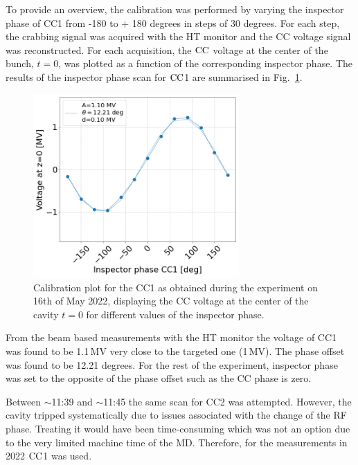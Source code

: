 To provide an overview, the calibration was performed by varying the inspector phase of CC1 from -180 to + 180 degrees in steps of 30 degrees. For each step, the crabbing signal was acquired with the HT monitor and the CC voltage signal was reconstructed. For each acquisition, the ${\mathrm{CC}}$ voltage at the center of the bunch, $t=0$, was plotted as a function of the corresponding inspector phase. The results of the inspector phase scan for ${\mathrm{CC}}$1 are summarised in Fig.~\ref{fig:Vcc_calibration_md_2022}.

\begin{figure}[!h] %
   \centering         
   \includegraphics[width=0.7\textwidth]{images/Ch8/Vcc_at_z_zero_vs_inspector_phase_CC1_for_thesis.png}
       \caption{Calibration plot for the CC1 as obtained during the experiment on 16th of May 2022, displaying the CC voltage at the center of the cavity $t=0$ for different values of the inspector phase.}
       \label{fig:Vcc_calibration_md_2022}
\end{figure}

From the beam based measurements with the HT monitor the voltage of CC1 was found to be 1.1\,MV very close to the targeted one (1\,MV). The phase offset was found to be 12.21 degrees. For the rest of the experiment, inspector phase was set to the opposite of the phase offset such as the CC phase is zero.

Between $\sim$11:39 and $\sim$11:45 the same scan for CC2 was attempted. However, the cavity tripped systematically due to issues associated with the change of the RF phase. Treating it would have been time-consuming which was not an option due to the very limited machine time of the MD. Therefore, for the measurements in 2022 ${\mathrm{CC}}$1 was used.

